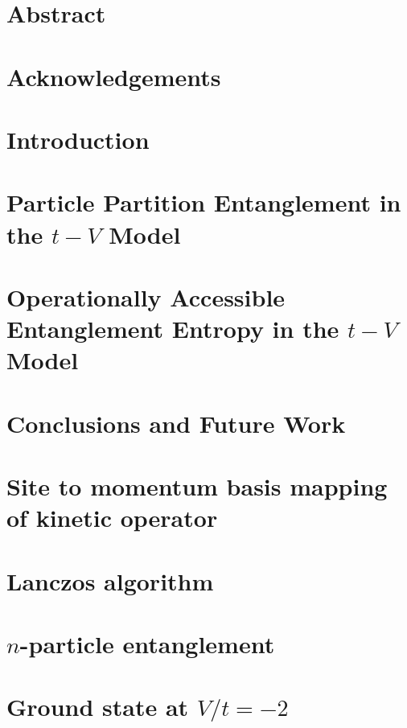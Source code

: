 \documentclass[12pt, two sided]{report}
\begin{document}



\chapter*{Abstract}
 

\chapter*{Acknowledgements}


\setcounter{page}{2}

\singlespacing
\tableofcontents
\doublespacing

\chapter{Introduction}



\chapter{Particle Partition Entanglement in the $t-V$ Model}


\chapter{Operationally Accessible Entanglement Entropy in the $t-V$ Model}


\chapter{Conclusions and Future Work}


\appendix

\chapter{Site to momentum basis mapping of kinetic operator}


\chapter{Lanczos algorithm}


\chapter{$n$-particle entanglement}


\chapter{Ground state at $V/t=-2$}



{} 

\end{document}
